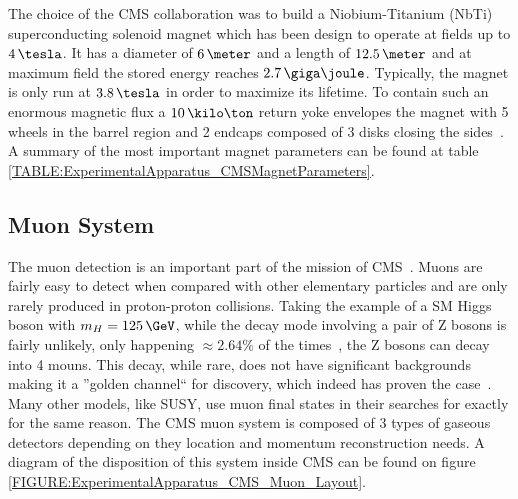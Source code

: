 The choice of the \gls{CMS} collaboration was to build a Niobium-Titanium (NbTi) superconducting solenoid magnet which has been design to operate at fields up to $4\,\tesla$. It has a diameter of $6\,\meter$ and a length of $12.5\,\meter$ and at maximum field the stored energy reaches $2.7\,\giga\joule$. Typically, the magnet is only run at $3.8\,\tesla$ in order to maximize its lifetime. To contain such an enormous magnetic flux a $10\,\kilo\ton$ return yoke envelopes the magnet with 5 wheels in the barrel region and 2 endcaps composed of 3 disks closing the sides~\cite{ARTICLE:TheCMSExperiment}. A summary of the most important magnet parameters can be found at table \ref{TABLE:ExperimentalApparatus_CMSMagnetParameters}.



\subsection{Muon System}
\label{SUBSECTION:ExperimentalApparatus_CMS_Moun}


The muon detection is an important part of the mission of \gls{CMS}~\cite{CMSTDR:CMSMuonSystem}. Muons are fairly easy to detect when compared with other elementary particles and are only rarely produced in proton-proton collisions. Taking the example of a \gls{SM} Higgs boson with $m_H=125\,\GeV$, while the decay mode involving a pair of Z bosons is fairly unlikely, only happening $\approx 2.64\%$ of the times~\cite{ARTICLE:PDG2014}, the Z bosons can decay into 4 mouns. This decay, while rare, does not have significant backgrounds making it a ''golden channel`` for discovery, which indeed has proven the case~\cite{ARTICLE:CMSHiggsObservation}. Many other models, like \gls{SUSY}, use muon final states in their searches for exactly for the same reason. The \gls{CMS} muon system is composed of 3 types of gaseous detectors depending on they location and momentum reconstruction needs. A diagram of the disposition of this system inside \gls{CMS} can be found on figure \ref{FIGURE:ExperimentalApparatus_CMS_Muon_Layout}.

